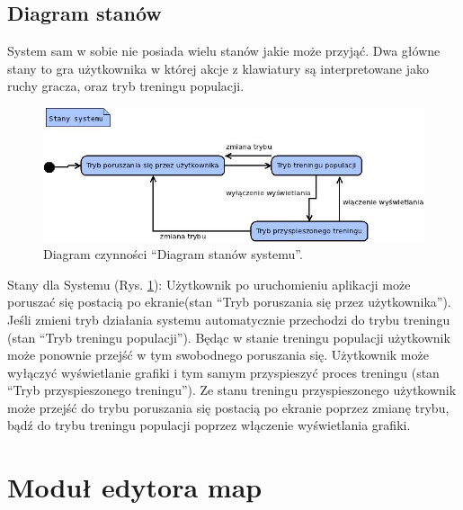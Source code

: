 \subsection{Diagram stanów}
\begin{par}
	System sam w sobie nie posiada wielu stanów jakie może przyjąć. Dwa główne stany to gra użytkownika w której akcje z klawiatury są interpretowane jako ruchy gracza, oraz tryb treningu populacji.
	\begin{figure}[!h]
		\centering
		\includegraphics[width=\textwidth]{obrazki/diagram_stanow.jpg}
		\caption{Diagram czynności ``Diagram stanów systemu''.}
		\label{fig:stany}
		\end{figure}
	\FloatBarrier
	Stany dla Systemu (Rys. \ref{fig:stany}):
	Użytkownik po uruchomieniu aplikacji może poruszać się postacią po ekranie(stan ``Tryb poruszania się przez użytkownika'').
	Jeśli zmieni tryb działania systemu automatycznie przechodzi do trybu treningu (stan ``Tryb treningu populacji'').
	Będąc w stanie treningu populacji użytkownik może ponownie przejść w tym swobodnego poruszania się.
	Użytkownik może wyłączyć wyświetlanie grafiki i tym samym przyspieszyć proces treningu (stan ``Tryb przyspieszonego treningu''). 
	Ze stanu treningu przyspieszonego użytkownik może przejść do trybu poruszania się postacią po ekranie poprzez zmianę trybu, bądź do trybu treningu
	populacji poprzez włączenie wyświetlania grafiki.
\end{par}

\section{Moduł edytora map}
